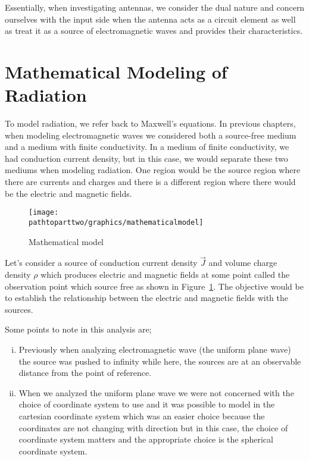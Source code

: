 Essentially, when investigating antennas, we consider the dual nature and concern ourselves with the input side when the antenna acts as a circuit element as well as treat it as a source of electromagnetic waves and provides their characteristics. 

\section{Mathematical Modeling of Radiation}
To model radiation, we refer back to Maxwell's equations. In previous chapters, when modeling electromagnetic waves we considered both a source-free medium and a medium with finite conductivity. In a medium of finite conductivity, we had conduction current density, but in this case, we would separate these two mediums when modeling radiation. One region would be the source region where there are currents and charges and there is a different region where there would be the electric and magnetic fields.
\begin{figure}[h]
\centering
\texttt{[image: \\pathtoparttwo/graphics/mathematicalmodel]}
\caption{Mathematical model}
\label{fig:mathematicalmodel}
\end{figure}

Let's consider a source of conduction current density $\vec{J}$ and volume charge density $\rho$ which produces electric and magnetic fields at some point called the observation point which source free as shown in Figure~\ref{fig:mathematicalmodel}. The objective would be to establish the relationship between the electric and magnetic fields with the sources.

Some points to note in this analysis are;
\begin{enumerate}[(i)]
\item Previously when analyzing electromagnetic wave (the uniform plane wave) the source was pushed to infinity while here, the sources are at an observable distance from the point of reference.
\item When we analyzed the uniform plane wave we were not concerned with the choice of coordinate system to use and it was possible to model in the cartesian coordinate system which was an easier choice because the coordinates are not changing with direction but in this case, the choice of coordinate system matters and the appropriate choice is the spherical coordinate system.
\end{enumerate}

